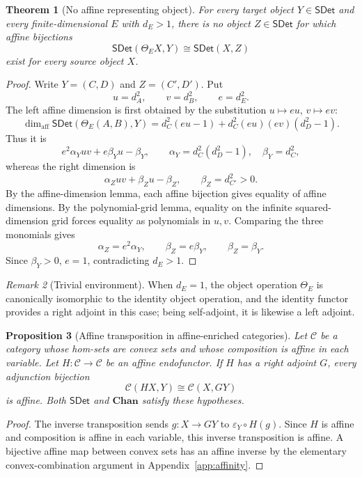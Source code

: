 \documentclass[11pt,a4paper]{article}
\theoremstyle{definition}
\theoremstyle{plain}
\newtheorem{theorem}{Theorem}[section]
\newtheorem{proposition}[theorem]{Proposition}
\theoremstyle{remark}
\newtheorem{remark}[theorem]{Remark}
\newcommand{\affdim}{\dim_{\mathrm{aff}}}
\newcommand{\SDet}{\mathsf{SDet}}
\begin{document}
\begin{theorem}[No affine representing object]
For every target object $Y\in\SDet$ and every finite-dimensional
$E$ with $d_E>1$, there is no object $Z\in\SDet$ for which affine
bijections
\[
\SDet(\Theta_EX,Y)\cong\SDet(X,Z)
\]
exist for every source object $X$.
\end{theorem}
\begin{proof}
Write $Y=(C,D)$ and $Z=(C',D')$. Put
\[
u=d_A^2,\qquad v=d_B^2,\qquad e=d_E^2.
\]
The left affine dimension is first obtained by the substitution
$u\mapsto eu$, $v\mapsto ev$:
\[
\affdim\SDet(\Theta_E(A,B),Y)
=d_C^2(eu-1)+d_C^2(eu)(ev)(d_D^2-1).
\]
Thus it is
\[
e^2\alpha_Yuv+e\beta_Yu-\beta_Y,
\qquad
\alpha_Y=d_C^2(d_D^2-1),\quad \beta_Y=d_C^2,
\]
whereas the right dimension is
\[
\alpha_Zuv+\beta_Zu-\beta_Z,
\qquad \beta_Z=d_{C'}^2>0.
\]
By the affine-dimension lemma, each affine bijection gives equality of
affine dimensions. By the polynomial-grid lemma, equality on the infinite
squared-dimension grid forces equality as polynomials in $u,v$. Comparing
the three monomials gives
\[
\alpha_Z=e^2\alpha_Y,
\qquad
\beta_Z=e\beta_Y,
\qquad
\beta_Z=\beta_Y.
\]
Since $\beta_Y>0$, $e=1$, contradicting $d_E>1$.
\end{proof}

\begin{remark}[Trivial environment]
When $d_E=1$, the object operation $\Theta_E$ is canonically isomorphic to
the identity object operation, and the identity functor provides a right
adjoint in this case; being self-adjoint, it is likewise a left adjoint.
\end{remark}

\begin{proposition}[Affine transposition in affine-enriched categories]
Let $\mathcal C$ be a category whose hom-sets are convex sets and whose
composition is affine in each variable. Let $H:\mathcal C\to\mathcal C$ be
an affine endofunctor. If $H$ has a right adjoint $G$, every adjunction
bijection
\[
\mathcal C(HX,Y)\cong\mathcal C(X,GY)
\]
is affine. Both $\SDet$ and $\mathbf{Chan}$ satisfy these hypotheses.
\end{proposition}
\begin{proof}
The inverse transposition sends $g:X\to GY$ to
$\varepsilon_Y\circ H(g)$. Since $H$ is affine and composition is affine
in each variable, this inverse transposition is affine. A bijective affine
map between convex sets has an affine inverse by the elementary
convex-combination argument in Appendix~\ref{app:affinity}.
\end{proof}
\end{document}
